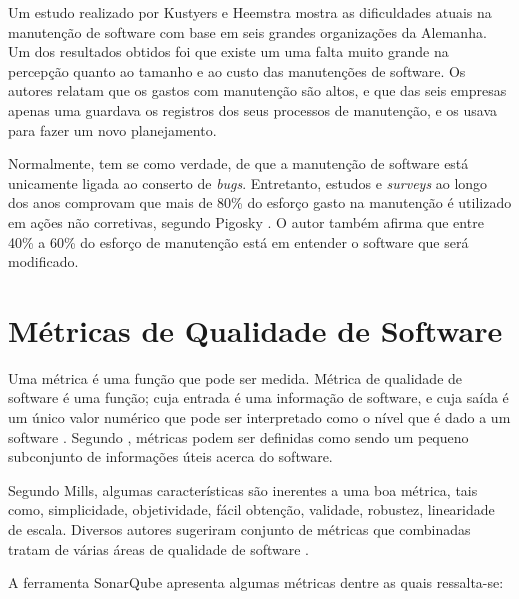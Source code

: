 Um estudo realizado por Kustyers e Heemstra \cite{kusters} mostra as dificuldades atuais na manutenção de software com base em seis grandes organizações da Alemanha. Um dos resultados obtidos foi que existe um uma falta muito grande na percepção quanto ao tamanho e ao custo das manutenções de software. Os autores relatam que os gastos com manutenção são altos, e que das seis empresas apenas uma guardava os registros  dos seus processos de manutenção, e os usava para fazer um novo planejamento. 

Normalmente, tem se como verdade, de que a manutenção de software está unicamente ligada ao conserto de \textit{bugs}. Entretanto, estudos e \textit{surveys} ao longo dos anos comprovam que mais de 80\% do esforço gasto na manutenção é utilizado em ações não corretivas, segundo Pigosky \cite{pigosky}. O autor também afirma que entre 40\% a 60\% do esforço de manutenção está em entender o software que será modificado.

\section{Métricas de Qualidade de Software}

Uma métrica é uma função que pode ser medida. Métrica de qualidade de software é uma função; cuja entrada é uma informação de software, e cuja saída é um único valor numérico que pode ser interpretado como o nível que é dado a um software \cite{karner}. Segundo \cite{pressman}, métricas podem ser definidas como sendo um pequeno subconjunto de informações úteis acerca do software.

Segundo Mills, algumas características são inerentes a uma boa métrica, tais como, simplicidade, objetividade, fácil obtenção, validade, robustez, linearidade de escala. Diversos autores sugeriram conjunto de métricas que combinadas tratam de várias áreas de qualidade de software \cite{paulo_meirelles}.

A ferramenta SonarQube apresenta algumas métricas dentre as quais ressalta-se:

